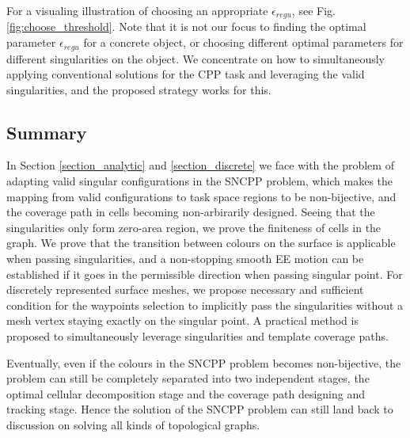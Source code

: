 \documentclass[Afour,sageh,times]{sagej}
\begin{document}
For a visualing illustration of choosing an appropriate $\epsilon_{regu}$, see Fig.\ref{fig:choose_threshold}. Note that it is not our focus to finding the optimal parameter $\epsilon_{regu}$ for a concrete object, or choosing different optimal parameters for different singularities on the object. We concentrate on how to simultaneously applying conventional solutions for the CPP task and leveraging the valid singularities, and the proposed strategy works for this. 

\subsection{Summary}
In Section \ref{section_analytic} and \ref{section_discrete} we face with the problem of adapting valid singular configurations in the SNCPP problem, which makes the mapping from valid configurations to task space regions to be non-bijective, and the coverage path in cells becoming non-arbirarily designed. 
Seeing that the singularities only form zero-area region, we prove the finiteness of cells in the graph. We prove that the transition between colours on the surface is applicable when passing singularities, and a non-stopping smooth EE motion can be established if it goes in the permissible direction when passing singular point. 
For discretely represented surface meshes, we propose necessary and sufficient condition for the waypoints selection to implicitly pass the singularities without a mesh vertex staying exactly on the singular point. A practical method is proposed to simultaneously leverage singularities and template coverage paths.  

Eventually, even if the colours in the SNCPP problem becomes non-bijective, the problem can still be completely separated into two independent stages, the optimal cellular decomposition stage and the coverage path designing and tracking stage. 
Hence the solution of the SNCPP problem can still land back to discussion on solving all kinds of topological graphs.
\end{document}
